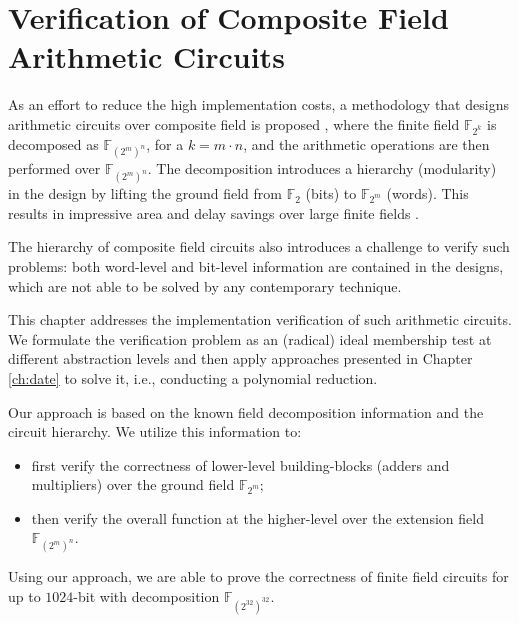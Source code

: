 \chapter{Verification of Composite Field Arithmetic Circuits} \label{ch:cf}

As an effort to reduce the high implementation costs, 
a methodology that designs arithmetic circuits over composite field is proposed \cite{phdpaar:1994},
where the finite field $\mathbb{F}_{2^k}$ is decomposed as $\mathbb{F}_{(2^m)^n}$, for a $k = m\cdot n$, 
and the arithmetic operations are then performed over $\mathbb{F}_{(2^m)^n}$. 
The decomposition introduces a hierarchy (modularity) in the design by lifting the ground field from $\mathbb{F}_2$
(bits) to $\mathbb{F}_{2^m}$ (words). This results in impressive area and delay
savings over large finite fields \cite{phdpaar:1994} \cite{cfmulti:1996} \cite{cf:2003}.  

The hierarchy of composite field circuits also introduces a challenge to verify such problems: 
both word-level and bit-level information are contained in the designs, which are not able to 
be solved by any contemporary technique.

This chapter addresses the implementation verification of such arithmetic circuits. 
We formulate the verification problem as an (radical) ideal membership test at different abstraction levels
and then apply approaches presented in Chapter \ref{ch:date} to solve it, i.e., conducting a polynomial reduction.

Our approach is based on the known field decomposition information and the
circuit hierarchy. 
We utilize this information to: 
\begin{itemize}
	\item first verify the correctness of lower-level building-blocks (adders and
			multipliers) over the ground field $\mathbb{F}_{2^m}$; 
	\item then verify the overall function at the higher-level over the extension field $\mathbb{F}_{(2^m)^n}$. 		
\end{itemize}

Using our approach, we are able to prove the correctness of finite field circuits for up to $1024$-bit 
with decomposition $\mathbb{F}_{(2^{32})^{32}}$.

